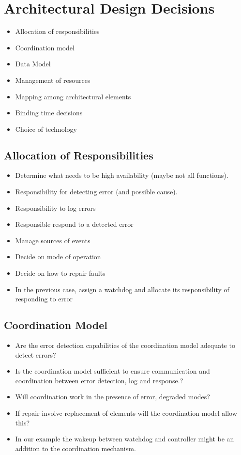 \documentclass{report}
\begin{document}
\section{Architectural Design Decisions}
\begin{itemize}
\item{Allocation of responsibilities}
\item{Coordination model}
\item{Data Model}
\item{Management of resources}
\item{Mapping among architectural elements}
\item{Binding time decisions}
\item{Choice of technology}
\end{itemize}

\subsection{Allocation of Responsibilities}

\begin{itemize}
\item{Determine what needs to be high availability (maybe not all functions).}
\item{Responsibility for detecting error (and possible cause).}
\item{Responsibility to log errors}
\item{Responsible respond to a detected error}
\item{Manage sources of events}
\item{Decide on mode of operation}
\item{Decide on how to repair faults}
\item{In the previous case, assign a watchdog and allocate its responsibility of responding to error}
\end{itemize}

\subsection{Coordination Model}
\begin{itemize}
\item{Are the error detection capabilities of the coordination model adequate to detect errors?}
\item{Is the coordination model sufficient to ensure communication and coordination between error detection, log and response.?}
\item{Will coordination work in the presence of error, degraded modes?}
\item{If repair involve replacement of elements will the coordination model allow this?}
\item{In our example the wakeup between watchdog and controller might be an addition to the coordination mechanism.}
\end{itemize}
\end{document}

